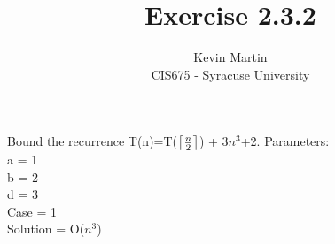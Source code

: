 \documentclass{article}
\author{Kevin Martin\\ CIS675 - Syracuse University}
\title{Exercise 2.3.2}
\begin{document}
\maketitle

Bound the recurrence T(n)=T(\(\left \lceil{n\over 2}\right \rceil\)) + 3\(n^3\)+2.
Parameters:\\
a = 1\\
b = 2\\
d = 3\\
Case = 1\\
Solution = O(\(n^3\))\\
\end{document}
